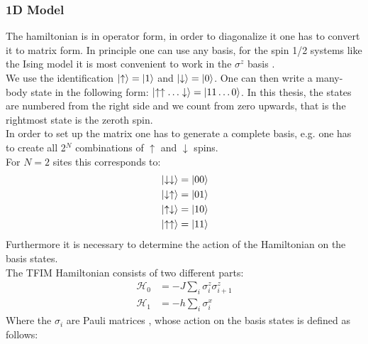 \documentclass{article}
\begin{document}
\subsubsection{1D Model}
The hamiltonian is in operator form, in order to diagonalize it one
has to convert it to matrix form. In principle one can use any basis,
for the spin 1/2 systems like the Ising model it is most convenient to
work in the $\sigma^z$ basis \cite{Noack,Laflorencie}.\\
We use the identification $\ket{\uparrow} = \ket{1}$ and $\ket{\downarrow} = \ket{0}$. One can then write a many-body state in the following form: $\ket{\uparrow \uparrow \dotso \downarrow} = \ket{11 \dotso 0}$. In this thesis, the states are numbered from the right side and we count from zero upwards, that is the rightmost state is the zeroth spin.\\
In order to set up the matrix one has to generate a complete basis, e.g. one has to create all 2$^{N}$ combinations of $\uparrow$ and $\downarrow$ spins.\\
For $N=2$ sites this corresponds to:
\begin{align*}
&\ket{\downarrow \downarrow} = \ket{00}\\
&\ket{\downarrow \uparrow} = \ket{01}\\
&\ket{\uparrow \downarrow} = \ket{10}\\
&\ket{\uparrow \uparrow} = \ket{11}\\
\end{align*}
Furthermore it is necessary to determine the action of the Hamiltonian on the basis states.\\
The TFIM Hamiltonian consists of two different parts:
\begin{align}
\label{eq:5}
\mathcal{H}_0 &= -J \sum\limits_{i}\sigma_i^z\sigma_{i+1}^z\\
\mathcal{H}_1 &= -h \sum\limits_i^{}\sigma_i^{x}
\end{align}
Where the $\sigma_i$ are Pauli matrices , whose action on the basis states is defined as follows:
\end{document}
